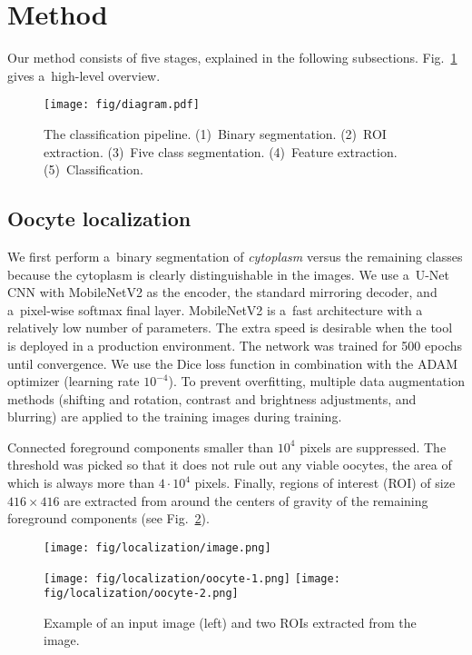 \documentclass[]{spie}  %
\begin{document}
\section{Method}
\label{sec:method}

Our method consists of five stages, explained in the following subsections. Fig.~\ref{fig:pipeline} gives a~high-level overview.

\begin{figure}[tb]
\texttt{[image: fig/diagram.pdf]}
\caption{The classification pipeline. (1)~Binary segmentation. (2)~ROI
extraction. (3)~Five class segmentation. (4)~Feature extraction. (5)~Classification.}
\label{fig:pipeline}
\end{figure}

\subsection{Oocyte localization}
\label{sec:localization}

We first perform a~binary segmentation of \textit{cytoplasm} versus
the remaining classes because the cytoplasm is clearly distinguishable in the
images.  We use a~U-Net \cite{ronneberger2015} CNN with MobileNetV2
\cite{sandler2018} as the encoder, the standard mirroring decoder, and
a~pixel-wise softmax final layer. MobileNetV2 is a~fast architecture with a
relatively low number of parameters. The extra speed is desirable when the tool
is deployed in a production environment. The network was trained for 500 epochs
until convergence. We use the Dice loss function in combination with the ADAM optimizer
(learning rate $10^{-4}$). To prevent overfitting, multiple data augmentation
methods (shifting and rotation, contrast and brightness adjustments, and
blurring) are applied to the training images during training.

Connected foreground components smaller than $10^4$ pixels are suppressed.
The threshold was picked so that it does not rule out any viable oocytes, the
area of which is always more than $4\cdot 10^4$ pixels.  Finally, regions of interest (ROI)
of size $416 \times 416$ are extracted from around the centers of gravity of
the remaining foreground components (see Fig.~\ref{fig:extraction}).

\begin{figure}[tb]
\centering
\begin{minipage}{55mm}
\texttt{[image: fig/localization/image.png]}
\end{minipage}
\begin{minipage}{20mm}
\texttt{[image: fig/localization/oocyte-1.png]}\vspace{.5mm}
\texttt{[image: fig/localization/oocyte-2.png]}
\end{minipage}
\caption{Example of an input image (left) and two ROIs extracted from the
image.}
\label{fig:extraction}
\end{figure}
\end{document}
